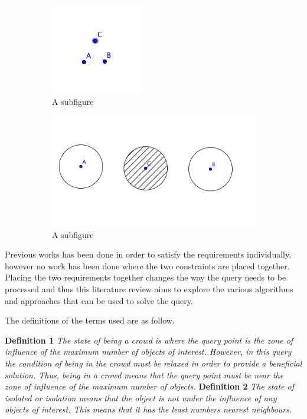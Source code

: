 \documentclass[a4paper,11pt]{article}
\begin{document}
\begin{figure}[h]
\centering
\begin{subfigure}{.4\textwidth}
  \centering
  \includegraphics[width=.4\linewidth]{3OOI}
  \caption{A subfigure}
  \label{fig:3OOI}
\end{subfigure}%
\begin{subfigure}{.4\textwidth}
  \centering
  \includegraphics[width=.4\linewidth]{2OOIFarSolution}
  \caption{A subfigure}
  \label{fig:2OOIFarSolution}
\end{subfigure}
\caption{}
\label{fig:Condition}
\end{figure}


Previous works has been done in order to satisfy the requirements individually,  however no work has been done where the two constraints are placed together. Placing the two requirements together changes the way the query needs to be processed and thus this literature review aims to explore the various algorithms and approaches that can be used to solve the query. 

The definitions of the terms used are as follow.

\textbf{Definition 1} \textit{The state of being a crowd is where the query point is the zone of influence of the maximum number of objects of interest. However, in this query the condition of being in the crowd must be relaxed in order to provide a beneficial solution. Thus, being in a crowd means that the query point must be near the zone of influence of the maximum number of objects.
}
\textbf{Definition 2} \textit{The state of isolated or isolation means that the object is not under the influence of any objects of interest. This means that it has the least numbers nearest neighbours. }
\end{document}
